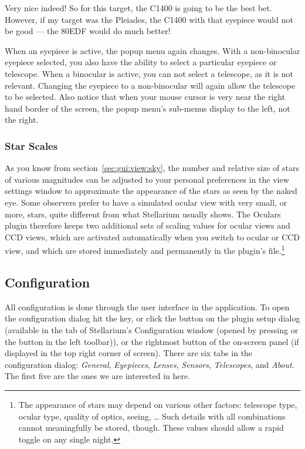 Very nice indeed! So for this target, the C1400 is going to be the best bet. However, if my target was the Pleiades, the C1400 with that eyepiece would not be good --- the 80EDF would do much better!

When an eyepiece is active, the popup menu again changes.  
With a non-binocular eyepiece selected, you also have the ability to select a particular eyepiece or telescope.
When a binocular is active, you can not select a telescope, as it is not relevant. 
Changing the eyepiece to a non-binocular will again allow the telescope to be selected. 
Also notice that when your mouse cursor is very near the right hand border of the screen, the popup menu's sub-menus display to the left, not the right.

\subsubsection{Star Scales}
As you know from section~\ref{sec:gui:view:sky}, the number and relative size of stars of various magnitudes 
can be adjusted to your personal preferences in the view settings window to approximate the appearance of the stars as seen by the naked eye. 
Some observers prefer to have a simulated ocular view with very small, or more, stars, quite different from what Stellarium usually shows. 
The Oculars plugin therefore keeps two additional sets of scaling values for ocular views and CCD views, which are activated 
automatically when you switch to ocular or CCD view, and which are stored immediately and permanently in the plugin's  file.\footnote{%
The appearance of stars may depend on various other factors: telescope type, ocular type, quality of optics, seeing, \ldots 
Such details with all combinations cannot meaningfully be stored, though. These values should allow a rapid toggle on any single night.}

\subsection{Configuration}
\label{sec:sec:plugins:Oculars:Configuration}
All configuration is done through the user interface in the application. 
To open the configuration dialog hit the  key, 
or click the  button on the plugin setup dialog (available in the
 tab of Stellarium's Configuration window (opened by 
pressing  or the  button in the left toolbar)), 
or the rightmost button of the on-screen panel (if displayed in the top right corner of screen). 
There are six tabs in the configuration dialog: \emph{General}, \emph{Eyepieces}, \emph{Lenses}, \emph{Sensors}, \emph{Telescopes}, and \emph{About}. The first five are the ones we are interested in here.

